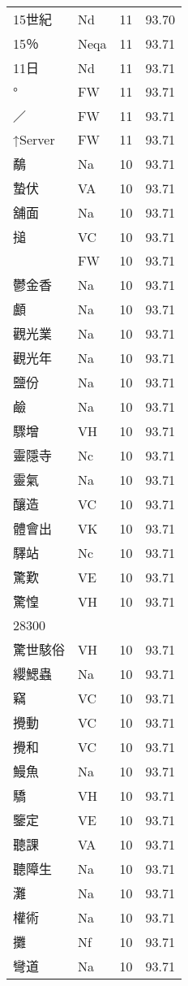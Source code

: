 \documentclass[twocolumn]{book}
\begin{document}
\begin{supertabular}{llrr}
15世紀 & Nd & 11 &  93.70\\
15％ & Neqa & 11 &  93.71\\
11日 & Nd & 11 &  93.71\\
° & FW & 11 &  93.71\\
／ & FW & 11 &  93.71\\
↑Server & FW & 11 &  93.71\\
鷸 & Na & 10 &  93.71\\
蟄伏 & VA & 10 &  93.71\\
舖面 & Na & 10 &  93.71\\
搥 & VC & 10 &  93.71\\
 & FW & 10 &  93.71\\
鬱金香 & Na & 10 &  93.71\\
顱 & Na & 10 &  93.71\\
觀光業 & Na & 10 &  93.71\\
觀光年 & Na & 10 &  93.71\\
鹽份 & Na & 10 &  93.71\\
鹼 & Na & 10 &  93.71\\
驟增 & VH & 10 &  93.71\\
靈隱寺 & Nc & 10 &  93.71\\
靈氣 & Na & 10 &  93.71\\
釀造 & VC & 10 &  93.71\\
體會出 & VK & 10 &  93.71\\
驛站 & Nc & 10 &  93.71\\
驚歎 & VE & 10 &  93.71\\
驚惶 & VH & 10 &  93.71\\
28300\\
驚世駭俗 & VH & 10 &  93.71\\
纓鰓蟲 & Na & 10 &  93.71\\
竊 & VC & 10 &  93.71\\
攪動 & VC & 10 &  93.71\\
攪和 & VC & 10 &  93.71\\
鰻魚 & Na & 10 &  93.71\\
驕 & VH & 10 &  93.71\\
鑒定 & VE & 10 &  93.71\\
聽課 & VA & 10 &  93.71\\
聽障生 & Na & 10 &  93.71\\
灘 & Na & 10 &  93.71\\
權術 & Na & 10 &  93.71\\
攤 & Nf & 10 &  93.71\\
彎道 & Na & 10 &  93.71\\

\end{supertabular}
\end{document}
